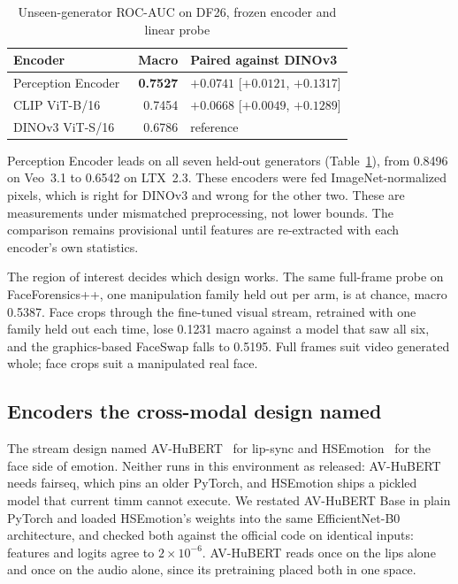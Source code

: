 \documentclass[conference]{IEEEtran}
\begin{document}
\begin{table}[htbp]
\caption{Unseen-generator ROC-AUC on DF26, frozen encoder and linear probe}
\label{tab:df26}
\centering
\begin{tabular}{lrl}
\toprule
Encoder & Macro & Paired against DINOv3 \\
\midrule
Perception Encoder~\cite{pe} & \textbf{0.7527} & $+0.0741$ [$+0.0121$, $+0.1317$] \\
CLIP ViT-B/16~\cite{clip} & 0.7454 & $+0.0668$ [$+0.0049$, $+0.1289$] \\
DINOv3 ViT-S/16 & 0.6786 & reference \\
\bottomrule
\end{tabular}
\end{table}

Perception Encoder leads on all seven held-out generators
(Table~\ref{tab:df26}), from 0.8496 on Veo~3.1 to 0.6542 on LTX~2.3. These
encoders were fed ImageNet-normalized pixels, which is right for DINOv3 and
wrong for the other two. These are measurements under mismatched preprocessing,
not lower bounds. The comparison remains provisional until features are
re-extracted with each encoder's own statistics.

The region of interest decides which design works. The same full-frame probe
on FaceForensics++, one manipulation family held out per arm, is at chance,
macro 0.5387. Face crops through the fine-tuned visual stream, retrained with
one family held out each time, lose 0.1231 macro against a model that saw all
six, and the graphics-based FaceSwap falls to 0.5195. Full frames suit video
generated whole; face crops suit a manipulated real face.

\subsection{Encoders the cross-modal design named}

The stream design named AV-HuBERT~\cite{avhubert} for lip-sync and
HSEmotion~\cite{hsemotion} for the face side of emotion. Neither runs in this
environment as released: AV-HuBERT needs fairseq, which pins an older PyTorch,
and HSEmotion ships a pickled model that current timm cannot execute. We
restated AV-HuBERT Base in plain PyTorch and loaded HSEmotion's weights into
the same EfficientNet-B0 architecture, and checked both against the official
code on identical inputs: features and logits agree to $2\times10^{-6}$.
AV-HuBERT reads once on the lips alone and once on the audio alone,
since its pretraining placed both in one space.
\end{document}
